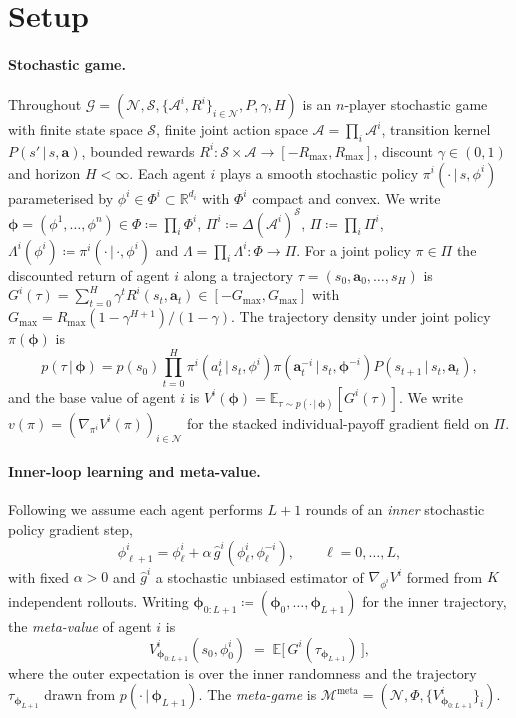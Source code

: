 \documentclass[11pt]{article}
\theoremstyle{definition}
\theoremstyle{remark}
\newcommand{\N}{\mathcal{N}}
\newcommand{\meta}{\mathrm{meta}}
\newcommand{\Mmeta}{\mathcal{M}^{\meta}}
\newcommand{\E}{\mathbb{E}}
\newcommand{\R}{\mathbb{R}}
\newcommand{\given}{\,\vert\,}
\newcommand{\defeq}{\coloneqq}
\begin{document}
\section{Setup}
\label{sec:setup}

\paragraph{Stochastic game.}
Throughout $\mathcal{G}=(\N,\mathcal{S},\{\mathcal{A}^i,R^i\}_{i\in\N},P,\gamma,H)$
is an $n$-player stochastic game with finite state space
$\mathcal{S}$, finite joint action space $\mathcal{A}=\prod_i\mathcal{A}^i$,
transition kernel $P(s'\given s,\bm a)$, bounded rewards
$R^i:\mathcal{S}\times\mathcal{A}\to[-R_{\max},R_{\max}]$, discount
$\gamma\in(0,1)$ and horizon $H<\infty$.  Each agent $i$ plays a
smooth stochastic policy $\pi^i(\cdot\given s,\phi^i)$ parameterised
by $\phi^i\in\Phi^i\subset\R^{d_i}$ with $\Phi^i$ compact and convex.
We write $\bm\phi=(\phi^1,\dots,\phi^n)\in\Phi\defeq\prod_i\Phi^i$,
$\Pi^i\defeq\Delta(\mathcal{A}^i)^{\mathcal{S}}$,
$\Pi\defeq\prod_i\Pi^i$, $\Lambda^i(\phi^i)\defeq\pi^i(\cdot\given\cdot,\phi^i)$
and $\Lambda=\prod_i\Lambda^i:\Phi\to\Pi$.  For a joint policy
$\pi\in\Pi$ the discounted return of agent $i$ along a trajectory
$\tau=(s_0,\bm a_0,\dots,s_H)$ is
$G^i(\tau)=\sum_{t=0}^H\gamma^t R^i(s_t,\bm a_t)\in[-G_{\max},G_{\max}]$
with $G_{\max}=R_{\max}(1-\gamma^{H+1})/(1-\gamma)$.  The trajectory
density under joint policy $\pi(\bm\phi)$ is
\[
  p(\tau\given\bm\phi) = p(s_0)\prod_{t=0}^{H}\pi^i(a_t^i\given s_t,\phi^i)\pi(\bm a_t^{-i}\given s_t,\bm\phi^{-i})P(s_{t+1}\given s_t,\bm a_t),
\]
and the base value of agent $i$ is
$V^i(\bm\phi)=\E_{\tau\sim p(\cdot\given\bm\phi)}[G^i(\tau)]$.  We
write $v(\pi)=(\nabla_{\pi^i}V^i(\pi))_{i\in\N}$ for the stacked
individual-payoff gradient field on $\Pi$.

\paragraph{Inner-loop learning and meta-value.}
Following \citet{kim2021meta} we assume each agent performs $L+1$
rounds of an \emph{inner} stochastic policy gradient step,
\begin{equation}
  \phi^i_{\ell+1} = \phi^i_\ell + \alpha\,\hat g^i(\phi^i_\ell,\phi^{-i}_\ell),
  \qquad \ell=0,\dots,L,
  \label{eq:inner}
\end{equation}
with fixed $\alpha>0$ and $\hat g^i$ a stochastic unbiased estimator of
$\nabla_{\phi^i}V^i$ formed from $K$ independent rollouts.  Writing
$\bm\phi_{0:L+1}\defeq(\bm\phi_0,\dots,\bm\phi_{L+1})$ for the inner
trajectory, the \emph{meta-value} of agent $i$ is
\begin{equation}
  V^i_{\bm\phi_{0:L+1}}(s_0,\phi^i_0)\;=\;\E\!\big[\,G^i(\tau_{\bm\phi_{L+1}})\,\big],
  \label{eq:metaval}
\end{equation}
where the outer expectation is over the inner randomness and the
trajectory $\tau_{\bm\phi_{L+1}}$ drawn from
$p(\cdot\given\bm\phi_{L+1})$.  The \emph{meta-game} is
$\Mmeta=(\N,\Phi,\{V^i_{\bm\phi_{0:L+1}}\}_i)$.
\end{document}
